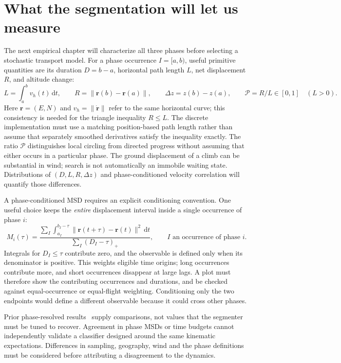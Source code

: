 \section{What the segmentation will let us measure}
\label{sec:phaseobs}
The next empirical chapter will characterize all three phases before selecting a
stochastic transport model. For a phase occurrence $I=[a,b)$, useful primitive quantities
are its duration $D=b-a$, horizontal path length $L$, net displacement $R$, and altitude
change:
\begin{equation}
 L=\int_a^b v_h(t)\,\mathrm dt,\qquad
 R=\|\mathbf r(b)-\mathbf r(a)\|,\qquad
 \Delta z=z(b)-z(a),\qquad
 \mathcal P=R/L\in[0,1]\quad(L>0).
 \label{eq:phaseprimitives}
\end{equation}
Here $\mathbf r=(E,N)$ and $v_h=\|\dot{\mathbf r}\|$ refer to the same
horizontal curve; this consistency is needed for the triangle inequality $R\le L$.
The discrete implementation must use a matching position-based path length rather
than assume that separately smoothed derivatives satisfy the inequality exactly.
The ratio $\mathcal P$ distinguishes local circling from directed progress without
assuming that either occurs in a particular phase. The ground displacement of a climb
can be substantial in wind; search is not automatically an immobile waiting state.
Distributions of $(D,L,R,\Delta z)$ and phase-conditioned velocity correlation will
quantify those differences.

A phase-conditioned MSD requires an explicit conditioning convention. One useful choice
keeps the \emph{entire} displacement interval inside a single occurrence of phase $i$:
\begin{equation}
 M_i(\tau)=
 \frac{\sum_I\int_{a_I}^{b_I-\tau}
       \|\mathbf r(t+\tau)-\mathbf r(t)\|^2\,\mathrm dt}
      {\sum_I(D_I-\tau)_+},
 \qquad I\text{ an occurrence of phase }i.
 \label{eq:phaseconditionalmsd}
\end{equation}
Integrals for $D_I\le\tau$ contribute zero, and the observable is defined only
when its denominator is positive. This weights eligible time origins;
long occurrences contribute more, and short occurrences disappear at large lags.
A plot must therefore show the contributing occurrences and durations, and be checked
against equal-occurrence or equal-flight weighting. Conditioning only the two endpoints
would define a different observable because it could cross other phases.

\label{sec:reproducing}
Prior phase-resolved results~\cite{vilpellet2026} supply comparisons, not values that the
segmenter must be tuned to recover. Agreement in phase MSDs or time budgets cannot
independently validate a classifier designed around the same kinematic expectations.
Differences in sampling, geography, wind and the phase definitions must be considered
before attributing a disagreement to the dynamics.

